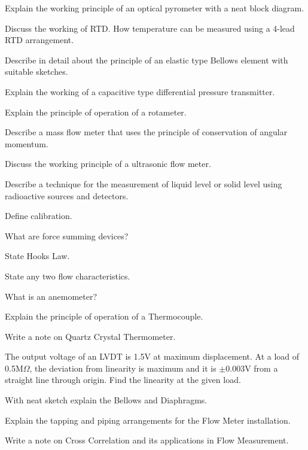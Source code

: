 \markB
\partC

\item \iitem Explain the working principle of an optical pyrometer with a neat block diagram.

\newpage \again

\Or
\item Discuss the working of RTD. How temperature can be measured using a 4-lead RTD
  arrangement.
\ene

\item \iitem Describe in detail about the principle of an elastic type Bellows element with suitable sketches.
\Or
\item Explain the working of a capacitive type differential pressure transmitter.
\ene

\item \iitem Explain the principle of operation of a rotameter.
\Or
\item Describe a mass flow meter that uses the principle of conservation of 
  angular momentum.
\ene

\item \iitem Discuss the working principle of a ultrasonic flow meter.
\Or
\item Describe a technique for the measurement of liquid level or solid level using radioactive
  sources and detectors.
\ene

\markC
\ene

\newpage

\sub{\subj}
\maxtime

\partA

\iitem Define calibration.
\item What are force summing devices?
\item State Hooks Law.
\item State any two flow characteristics.
\item What is an anemometer?

\markA
\partB

\item Explain the principle of operation of a Thermocouple.
\item Write a note on Quartz Crystal Thermometer.
\item The output voltage of an LVDT is 1.5V at maximum displacement. At a load of
  0.5M$\Omega$, the deviation from linearity is maximum and it is $\pm$0.003V from a straight line
  through origin. Find the linearity at the given load.
\item With neat sketch explain the Bellows and Diaphragms.
\item Explain the tapping and piping arrangements for the Flow Meter installation.
\item Write a note on Cross Correlation and its applications in Flow Measurement.

